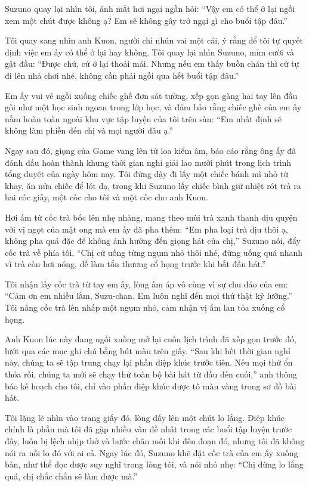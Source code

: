 ﻿\documentclass[../main.tex]{subfiles}
\begin{document}
Suzuno quay lại nhìn tôi, ánh mắt hơi ngại ngần hỏi: ``Vậy em có thể ở lại ngồi xem một chút được không ạ? Em sẽ không gây trở ngại gì cho buổi tập đâu.''

Tôi quay sang nhìn anh Kuon, người chỉ nhún vai một cái, ý rằng để tôi tự quyết định việc em ấy có thể ở lại hay không. Tôi quay lại nhìn Suzuno, mỉm cười và gật đầu: ``Được chứ, cứ ở lại thoải mái. Nhưng nếu em thấy buồn chán thì cứ tự đi lên nhà chơi nhé, không cần phải ngồi qua hết buổi tập đâu.''

Em ấy vui vẻ ngồi xuống chiếc ghế đơn sát tường, xếp gọn gàng hai tay lên đầu gối như một học sinh ngoan trong lớp học, và đảm bảo rằng chiếc ghế của em ấy nằm hoàn toàn ngoài khu vực tập luyện của tôi trên sàn: ``Em nhất định sẽ không làm phiền đến chị và mọi người đâu ạ.''

Ngay sau đó, giọng của Game vang lên từ loa kiểm âm, báo cáo rằng ông ấy đã đánh dấu hoàn thành khung thời gian nghỉ giải lao mười phút trong lịch trình tổng duyệt của ngày hôm nay. Tôi đứng dậy đi lấy một chiếc bánh mì nhỏ từ khay, ăn nửa chiếc để lót dạ, trong khi Suzuno lấy chiếc bình giữ nhiệt rót trà ra hai cốc giấy, một cốc cho tôi và một cốc cho anh Kuon.

Hơi ấm từ cốc trà bốc lên nhẹ nhàng, mang theo mùi trà xanh thanh dịu quyện với vị ngọt của mật ong mà em ấy đã pha thêm: ``Em pha loại trà dịu thôi ạ, không pha quá đặc để không ảnh hưởng đến giọng hát của chị,'' Suzuno nói, đẩy cốc trà về phía tôi. ``Chị cứ uống từng ngụm nhỏ thôi nhé, đừng uống quá nhanh vì trà còn hơi nóng, dễ làm tổn thương cổ họng trước khi bắt đầu hát.''

Tôi nhận lấy cốc trà từ tay em ấy, lòng ấm áp vô cùng vì sự chu đáo của em: ``Cảm ơn em nhiều lắm, Suzu-chan. Em luôn nghĩ đến mọi thứ thật kỹ lưỡng.'' Tôi nâng cốc trà lên nhấp một ngụm nhỏ, cảm nhận vị ấm lan tỏa xuống cổ họng.

Anh Kuon lúc này đang ngồi xuống mở lại cuốn lịch trình đã xếp gọn trước đó, lướt qua các mục ghi chú bằng bút màu trên giấy. ``Sau khi hết thời gian nghỉ này, chúng ta sẽ tập trung chạy lại phần điệp khúc trước tiên. Nếu mọi thứ ổn thỏa rồi, chúng ta mới sẽ chạy thử toàn bộ bài hát từ đầu đến cuối,'' anh thông báo kế hoạch cho tôi, chỉ vào phần điệp khúc được tô màu vàng trong sơ đồ bài hát.

Tôi lặng lẽ nhìn vào trang giấy đó, lòng dấy lên một chút lo lắng. Điệp khúc chính là phần mà tôi đã gặp nhiều vấn đề nhất trong các buổi tập luyện trước đây, luôn bị lệch nhịp thở và bước chân mỗi khi đến đoạn đó, nhưng tôi đã không nói ra nỗi lo đó với ai cả. Ngay lúc đó, Suzuno khẽ đặt cốc trà của em ấy xuống bàn, như thể đọc được suy nghĩ trong lòng tôi, và nói nhỏ nhẹ: ``Chị đừng lo lắng quá, chị chắc chắn sẽ làm được mà.''
\end{document}
